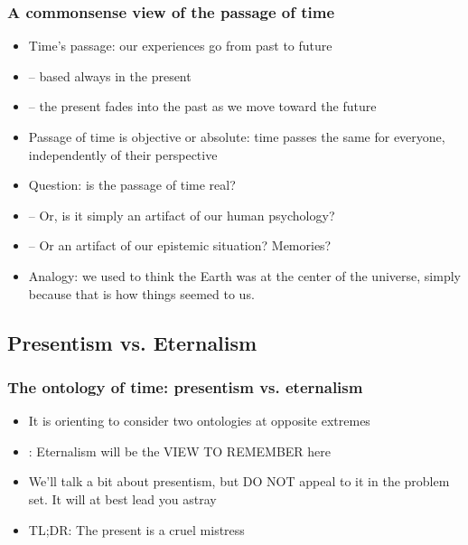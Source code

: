 \begin{frame}
\frametitle{A commonsense view of the passage of time}

\begin{itemize}%

\item Time’s passage: our experiences go from past to future
\item[] -- based always in the present
\item[] -- the present fades into the past as we move toward the future

\item Passage of time is objective or absolute: time passes the same for everyone, independently of their perspective

\item Question: is the passage of time real? 
\item[] -- Or, is it simply an artifact of our human psychology? 
\item[] -- Or an artifact of our epistemic situation? Memories?

\item Analogy: we used to think the Earth was at the center of the universe, simply because that is how things seemed to us. 



\end{itemize}
\end{frame}

\subsection{Presentism vs. Eternalism}

\begin{frame}
\frametitle{The ontology of time: presentism vs. eternalism}

\begin{itemize}[<+->]

\item It is orienting to consider two ontologies at opposite extremes

\item {}: Eternalism will be the VIEW TO REMEMBER here

\item We'll talk a bit about presentism, but DO NOT appeal to it in the problem set. It will at best lead you astray

\item TL;DR: The present is a cruel mistress 


\end{itemize}
\end{frame}


